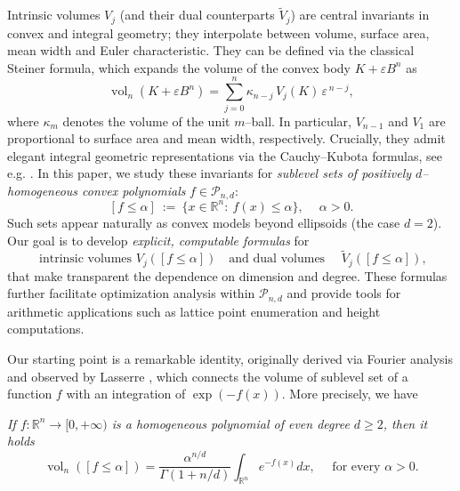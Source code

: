 \documentclass[11pt]{article}
\theoremstyle{definition}
\numberwithin{equation}{section}
\newcommand{\R}{\mathbb{R}}
\newcommand{\cP}{\mathcal{P}}        %
\DeclareMathOperator{\vol}{vol}
\begin{document}
Intrinsic volumes $V_j$ (and their dual counterparts $\widetilde V_j$) are central invariants in convex and integral geometry; they interpolate between volume, surface area, mean width and Euler characteristic.
They can be defined via the classical Steiner formula, which expands the volume of the convex body $K + \varepsilon B^n$ as
\[
\vol_n(K + \varepsilon B^n)
  = \sum_{j=0}^n \kappa_{n-j}\, V_j(K)\, \varepsilon^{\,n-j},
\]
where \(\kappa_m\) denotes the volume of the unit \(m\)–ball.
In particular, \(V_{n-1}\) and \( V_1\) are proportional to surface area and mean width, respectively. 
Crucially, they admit elegant integral geometric representations via the Cauchy–Kubota formulas, see e.g. \cite{Schneider,SW_2008}.
In this paper, we study these invariants for \emph{sublevel sets of positively $d$–homogeneous convex polynomials} \(f\in\cP_{n,d}\): 
\[
[f\le \alpha]\ :=\ \{x\in\R^n:\ f(x)\le \alpha\},\quad \ \alpha>0.
\]
Such sets appear naturally as convex models beyond ellipsoids (the case \(d=2\)).
Our goal is to develop \emph{explicit, computable formulas} for
\[
\text{ intrinsic volumes }V_j([f\le\alpha])\quad\text{and dual volumes }\quad \widetilde V_j([f\le\alpha]),
\]
that make transparent the dependence on dimension and degree.
These formulas further facilitate optimization analysis within $\cP_{n,d}$ and provide tools for arithmetic applications such as lattice point enumeration and height computations.

\medskip

Our starting point is a remarkable identity, originally derived via Fourier analysis and observed by Lasserre \cite{La_2015}, which connects the volume of sublevel set of a function $f$ with an integration of $\exp(-f(x))$.
More precisely, we have
\begin{center}
    \textit{If $f : \R^n \to [0, + \infty)$ is a homogeneous polynomial of even degree $d \geq 2$, then it holds
    \begin{equation}\label{lasserre}
        \vol_n([f \leq \alpha]) = \dfrac{\alpha^{n/d}}{\Gamma(1 + n/d)} \int_{\R^n} e^{-f(x)} dx, \quad \text{ for every } \alpha > 0. 
    \end{equation}
    }
\end{center}

\medskip
\end{document}
